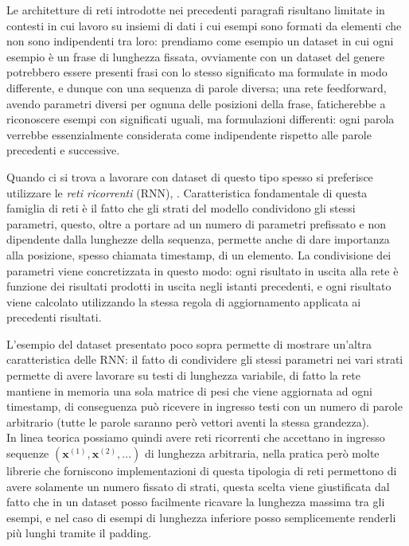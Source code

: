 \documentclass[../../main.tex]{subfiles}
\begin{document}
Le architetture di reti introdotte nei precedenti paragrafi risultano limitate in contesti in cui lavoro su insiemi di dati i cui esempi sono formati da elementi che non sono indipendenti tra loro: prendiamo come esempio un dataset in cui ogni esempio è un frase di lunghezza fissata, ovviamente con un dataset del genere potrebbero essere presenti frasi con lo stesso significato ma formulate in modo differente, e dunque con una sequenza di parole diversa; una rete feedforward, avendo parametri diversi per ognuna delle posizioni della frase, faticherebbe a riconoscere esempi con significati uguali, ma formulazioni differenti: ogni parola verrebbe essenzialmente considerata come indipendente rispetto alle parole precedenti e successive.

Quando ci si trova a lavorare con dataset di questo tipo spesso si preferisce utilizzare le \textit{reti ricorrenti} (RNN), \cite{rumelhart:errorpropnonote}. Caratteristica fondamentale di questa famiglia di reti è il fatto che gli strati del modello condividono gli stessi parametri, questo, oltre a portare ad un numero di parametri prefissato e non dipendente dalla lunghezze della sequenza, permette anche di dare importanza alla posizione, spesso chiamata timestamp, di un elemento. La condivisione dei parametri viene concretizzata in questo modo: ogni risultato in uscita alla rete è funzione dei risultati prodotti in uscita negli istanti precedenti, e ogni risultato viene calcolato utilizzando la stessa regola di aggiornamento applicata ai precedenti risultati.

L'esempio del dataset presentato poco sopra permette di mostrare un'altra caratteristica delle RNN: il fatto di condividere gli stessi parametri nei vari strati permette di avere lavorare su testi di lunghezza variabile, di fatto la rete mantiene in memoria una sola matrice di pesi che viene aggiornata ad ogni timestamp, di conseguenza può ricevere in ingresso testi con un numero di parole arbitrario (tutte le parole saranno però vettori aventi la stessa grandezza).\\
In linea teorica possiamo quindi avere reti ricorrenti che accettano in ingresso sequenze $(\boldsymbol{x}^{(1)}, \boldsymbol{x}^{(2)}, \dots)$ di lunghezza arbitraria, nella pratica però molte librerie che forniscono implementazioni di questa tipologia di reti permettono di avere solamente un numero fissato di strati, questa scelta viene giustificata dal fatto che in un dataset posso facilmente ricavare la lunghezza massima tra gli esempi, e nel caso di esempi di lunghezza inferiore posso semplicemente renderli più lunghi tramite il padding.
\end{document}
